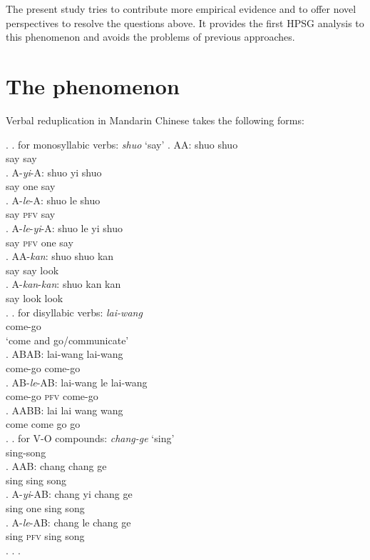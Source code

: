 \documentclass[
a4paper,
10pt,
oneside,
]{scrartcl}
\begin{document}
The present study tries to contribute more empirical evidence and to offer novel perspectives to
resolve the questions above. It provides the first HPSG analysis to this phenomenon and avoids the
problems of previous approaches.



\section[The phenomenon]{The phenomenon}\label{sec:Phen}

Verbal reduplication in Mandarin Chinese takes the following forms:

\begin{multicols}{2}
\ex.
	\a. for monosyllabic verbs: \emph{shuo} `say'
		\ag. AA: shuo shuo\\
		{} say say\\
		\bg. A-\emph{yi}-A: shuo yi shuo\\
		{} say one say\\
		\bg. A-\emph{le}-A: shuo le shuo\\
		{} say \textsc{pfv} say\\
		\bg. A-\emph{le}-\emph{yi}-A: shuo le yi shuo\\
		{} say \textsc{pfv} one say\\
		\bg. AA-\emph{kan}: shuo shuo kan\\
		{} say say look\\
		\bg. A-\emph{kan}-\emph{kan}\footnotemark: shuo kan kan\\
		 {} say look look\\
		\z.
	\bg. for disyllabic verbs: \emph{lai-wang}\\
	{} {} {} come-go\\
	\hspace{1cm} `come and go/communicate'\\
	\columnbreak
		\ag. ABAB: lai-wang lai-wang\\
		{} come-go come-go\\
		\bg. AB-\emph{le}-AB: lai-wang le lai-wang\\
		{} come-go \textsc{pfv} come-go\\
		\bg. AABB: lai lai wang wang\\
		{} come come go go\\
		\z.
	\bg. for V-O compounds: \emph{chang-ge} `sing'\\
	{} {} {} sing-song\\
		\ag. AAB: chang chang ge\\
		{} sing sing song\\
		\bg. A-\emph{yi}-AB: chang yi chang ge\\
		{} sing one sing song\\
		\cg. A-\emph{le}-AB: chang le chang ge\\
		{} sing \textsc{pfv} sing song\\
		\z.
	\z.
\z.
\end{multicols}
\end{document}
